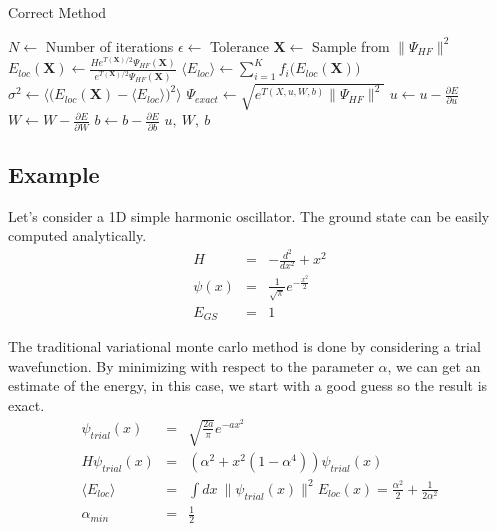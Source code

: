 \documentclass[12pt,a4paper]{article}
\begin{document}
\begin{algorithm}
  \caption{Correct Method}
  \begin{algorithmic}
      \State $N \gets$ Number of iterations
      \State $\epsilon \gets$ Tolerance
        \State $\mathbf{X} \gets$ Sample from $\|\Psi_{HF}\|^2$
        \State $E_{loc}(\mathbf{X}) \gets \frac{He^{T(\mathbf{X})/2}\Psi_{HF}(\mathbf{X})}{e^{T(\mathbf{X})/2}\Psi_{HF}(\mathbf{X})}$
        \State $\langle E_{loc} \rangle \gets \sum_{i=1}^{K} f_i\bigg(E_{loc}(\mathbf{X})\bigg)$
        \State $\sigma^2 \gets \bigg\langle \bigg(E_{loc}(\mathbf{X}) - \langle E_{loc} \rangle \bigg)^2 \bigg\rangle$
        \State {}
      \EndWhile
      \State $\Psi_{exact} \gets \sqrt{e^{T(X,u,W,b)}\|\Psi_{HF}\|^2}$
    \EndProcedure
    \Statex
      \State $u\gets u -\frac{\partial E}{\partial u}$
      \State $W\gets W -\frac{\partial E}{\partial W}$
      \State $b\gets b -\frac{\partial E}{\partial b}$
      \State \Return $u,\ W,\ b$
    \EndFunction
  \end{algorithmic}
\end{algorithm}

\subsection{Example}
Let's consider a 1D simple harmonic oscillator. The ground state can be easily computed analytically.
\begin{eqnarray*}
  H &=& -\frac{d^2}{dx^2} + x^2\\
  \psi(x) &=& \frac{1}{\sqrt{\pi}}e^{-\frac{x^2}{2}}\\
  E_{GS} &=& 1
\end{eqnarray*}

The traditional variational monte carlo method is done by considering a trial wavefunction. By minimizing with respect to the parameter $\alpha$, we can get an estimate of the energy, in this case, we start with a good guess so the result is exact.
\begin{eqnarray*}
  \psi_{trial}(x) &=& \sqrt{\frac{2a}{\pi}}e^{-ax^2}\\
  H\psi_{trial}(x) &=& (\alpha^2 + x^2(1-\alpha^4))\psi_{trial}(x)\\
  \langle E_{loc} \rangle &=& \int dx\ \|\psi_{trial}(x)\|^2 E_{loc}(x) = \frac{\alpha^2}{2}+\frac{1}{2\alpha^2}\\
  \alpha_{min} &=& \frac{1}{2}
\end{eqnarray*}
\end{document}
